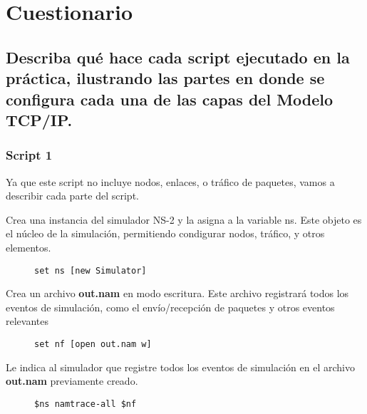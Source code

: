 \section*{Cuestionario}

\subsection*{Describa qu\'e hace cada script ejecutado en la pr\'actica, ilustrando las partes en donde se configura cada una de las
capas del Modelo TCP/IP.}

\subsubsection*{Script 1}
\noindent Ya que este script no incluye nodos, enlaces, o tr\'afico de paquetes, vamos a describir cada parte del script.

\noindent Crea una instancia del simulador NS-2 y la asigna a la variable ns. Este objeto es el n\'ucleo de la simulaci\'on, permitiendo
condigurar nodos, tr\'afico, y otros elementos.
\begin{figure}[H]
  \centering
  \begin{lstlisting}[frame=single, breaklines=true, basicstyle=\footnotesize\ttfamily, breakatwhitespace=false, 
    columns=flexible, tabsize=2, showstringspaces=false]
    set ns [new Simulator]
  \end{lstlisting}
\end{figure}

Crea un archivo \textbf{out.nam} en modo escritura. Este archivo registrar\'a todos los eventos de simulaci\'on, como el env\'io/recepci\'on
de paquetes y otros eventos relevantes
\begin{figure}[H]
  \centering
  \begin{lstlisting}[frame=single, breaklines=true, basicstyle=\footnotesize\ttfamily, breakatwhitespace=false, 
    columns=flexible, tabsize=2, showstringspaces=false]
    set nf [open out.nam w]
  \end{lstlisting}
\end{figure}

Le indica al simulador que registre todos los eventos de simulaci\'on en el archivo \textbf{out.nam} previamente creado.
\begin{figure}[H]
  \centering
  \begin{lstlisting}[frame=single, breaklines=true, basicstyle=\footnotesize\ttfamily, breakatwhitespace=false, 
    columns=flexible, tabsize=2, showstringspaces=false]
    $ns namtrace-all $nf
  \end{lstlisting}
\end{figure}


